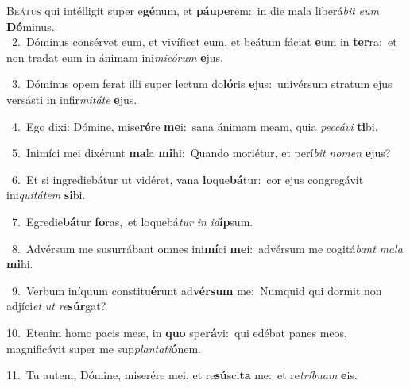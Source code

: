 \lettrine{\initial\textcolor{\initialcolor}{B}}{eátus} qui intélligit super e\-\textbf{gé}\-num, et \textbf{páu}\-\textbf{pe}rem:~\star in die mala liberá\textit{bit} \textit{e}\-\textit{um} \textbf{Dó}\-minus.\\
{\numbfont\textcolor{\numbcolor}{~2.}}~Dóminus consérvet eum, et vivíficet eum, et beátum fáciat \textbf{e}\-um in \textbf{ter}\-ra:~\star et non tradat eum in ánimam ini\-\textit{mi}\-\textit{có}\textit{rum} \textbf{e}\-jus.\par
{\numbfont\textcolor{\numbcolor}{~3.}}~Dóminus opem ferat illi super lectum do\-\textbf{ló}\-ris \textbf{e}\-jus:~\star univérsum stratum ejus versásti in infir\-\textit{mi}\-\textit{tá}\textit{te} \textbf{e}\-jus.\par
{\numbfont\textcolor{\numbcolor}{~4.}}~Ego dixi: Dómine, mise\-\textbf{ré}\-re \textbf{me}\-i:~\star sana ánimam meam, quia \textit{pec}\-\textit{cá}\textit{vi} \textbf{ti}\-bi.\par
{\numbfont\textcolor{\numbcolor}{~5.}}~Inimíci mei dixérunt \textbf{ma}\-la \textbf{mi}\-hi:~\star Quando moriétur, et perí\textit{bit} \textit{no}\-\textit{men} \textbf{e}\-jus?\par
{\numbfont\textcolor{\numbcolor}{~6.}}~Et si ingrediebátur ut vidéret, vana \textbf{lo}\-que\-\textbf{bá}\-tur:~\star cor ejus congregávit ini\-\textit{qui}\-\textit{tá}\textit{tem} \textbf{si}\-bi.\par
{\numbfont\textcolor{\numbcolor}{~7.}}~Egredie\-\textbf{bá}\-tur \textbf{fo}\-ras,~\star et loquebá\textit{tur} \textit{in} \textit{id}\-\textbf{íp}sum.\par
{\numbfont\textcolor{\numbcolor}{~8.}}~Advérsum me susurrábant omnes ini\-\textbf{mí}\-ci \textbf{me}\-i:~\star advérsum me cogitá\textit{bant} \textit{ma}\-\textit{la} \textbf{mi}\-hi.\par
{\numbfont\textcolor{\numbcolor}{~9.}}~Verbum iníquum constitu\-\textbf{é}\-runt ad\-\textbf{vér}\-\textbf{sum} me:~\star Numquid qui dormit non adjíci\textit{et} \textit{ut} \textit{re}\-\textbf{súr}gat?\par
{\numbfont\textcolor{\numbcolor}{10.}}~Etenim homo pacis meæ, in \textbf{quo} spe\-\textbf{rá}\-vi:~\star qui edébat panes meos, magnificávit super me sup\-\textit{plan}\-\textit{ta}\textit{ti}\textbf{ó}nem.\par
{\numbfont\textcolor{\numbcolor}{11.}}~Tu autem, Dómine, miserére mei, et re\-\textbf{sú}\-sci\textbf{ta} me:~\star et re\-\textit{trí}\-\textit{bu}\textit{am} \textbf{e}\-is.\par
